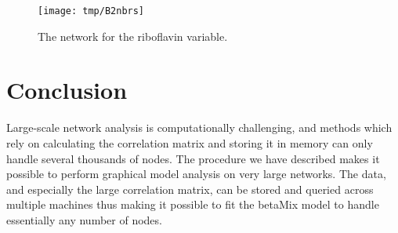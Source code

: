 \documentclass[a4paper,10pt]{article}
\begin{document}
\begin{figure}[htbp]
\begin{center}
\texttt{[image: tmp/B2nbrs]}
\caption{The network for the riboflavin variable.}
\label{b2nbrs}
\end{center}
\end{figure}

\section{Conclusion}
Large-scale network analysis is computationally challenging, and methods which rely on calculating the correlation matrix and storing it in memory can only handle several thousands of nodes.
The procedure we have described makes it possible to perform graphical model analysis on very large networks. The data, and especially the large correlation matrix, can be stored and queried across multiple machines thus making it possible to fit the betaMix model to handle essentially any number of nodes.




\end{document}
